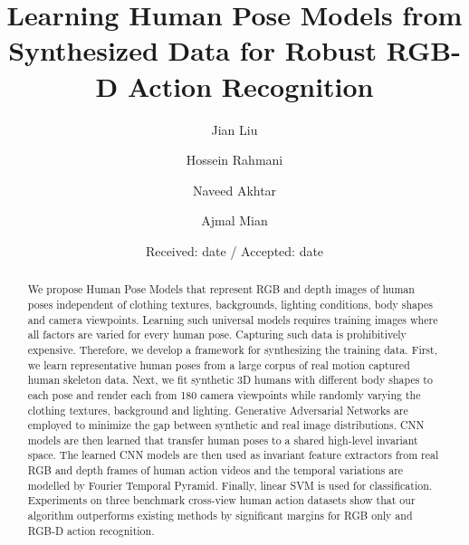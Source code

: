 \documentclass[twocolumn]{svjour3}          \smartqed  \usepackage{graphicx}
\begin{document}
\title{Learning Human Pose Models from Synthesized Data for Robust RGB-D Action Recognition}




\author{Jian Liu         \and
        Hossein Rahmani	 \and
        Naveed Akhtar \and
        Ajmal Mian }




\date{Received: date / Accepted: date}



\maketitle

\begin{abstract}
We propose Human Pose Models that represent RGB and depth images of human poses independent of clothing textures, backgrounds, lighting conditions, body shapes and camera viewpoints. Learning such universal models requires training images where all factors are varied for every human pose. Capturing such data is prohibitively expensive. Therefore, we develop a framework for synthesizing the training data. First, we learn representative human poses from a large corpus of real motion captured human skeleton data. Next, we fit synthetic 3D humans with different body shapes to each pose and render each from 180 camera viewpoints while randomly varying the clothing textures, background and lighting. Generative Adversarial Networks are employed to minimize the gap between synthetic and real image distributions. CNN models are then learned that transfer human poses to a shared high-level invariant space. The learned CNN models are then used as invariant feature extractors from real RGB and depth frames of human action videos and the temporal variations are modelled by Fourier Temporal Pyramid. Finally, linear SVM is used for classification. Experiments on three benchmark cross-view human action datasets show that our algorithm outperforms existing methods by significant margins for RGB only and RGB-D action recognition.
\end{abstract}
\end{document}
